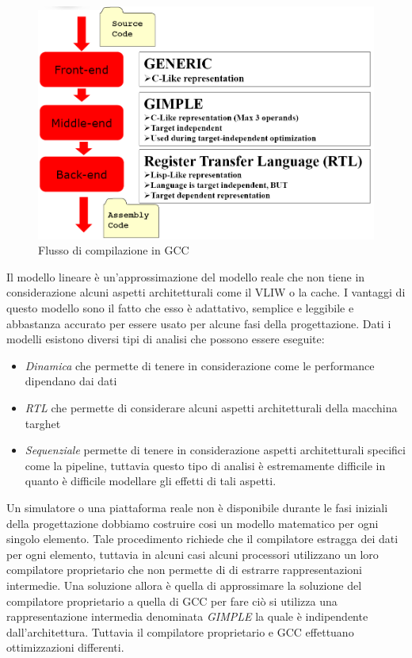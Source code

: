 \begin{figure}
\centering
\includegraphics[scale=0.4]{img/gccschema.png}
\caption{Flusso di compilazione in GCC}\label{fig:gccschema}
\end{figure}
Il modello lineare è un'approssimazione del modello reale che non tiene in considerazione alcuni aspetti architetturali come il VLIW o la cache. I vantaggi di questo modello sono il fatto che esso è adattativo, semplice e leggibile e abbastanza accurato per essere usato per alcune fasi della progettazione.
Dati i modelli esistono diversi tipi di analisi che possono essere eseguite:
\begin{itemize}
\item \emph{Dinamica} che permette di tenere in considerazione come le performance dipendano dai dati 
\item \emph{RTL} che permette di considerare alcuni aspetti architetturali della macchina targhet
\item \emph{Sequenziale} permette di tenere in considerazione aspetti architetturali specifici come la pipeline, tuttavia questo tipo di analisi è estremamente difficile in quanto è difficile modellare gli effetti di tali aspetti.
\end{itemize}
Un simulatore o una piattaforma reale non è disponibile durante le fasi iniziali della progettazione dobbiamo costruire cosi un modello matematico per ogni singolo elemento. Tale procedimento richiede che il compilatore estragga dei dati per ogni elemento, tuttavia in alcuni casi alcuni processori utilizzano un loro compilatore proprietario che non permette di di estrarre rappresentazioni intermedie. Una soluzione allora è quella di approssimare la soluzione del compilatore proprietario a quella di GCC per fare ciò si utilizza una rappresentazione intermedia denominata \emph{GIMPLE} la quale è indipendente dall'architettura. Tuttavia il compilatore proprietario e GCC effettuano ottimizzazioni differenti.
